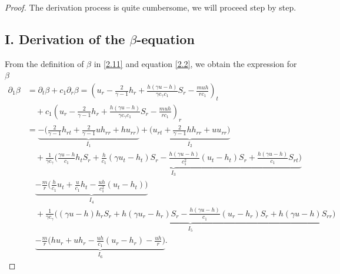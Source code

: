 \documentclass[11pt,reqno]{article}
\numberwithin{equation}{section}
\begin{document}
\begin{proof}
The derivation process is quite cumbersome, we will proceed step by step.

\subsection*{I. Derivation of the $\beta$-equation}
From the definition of $\beta$ in \eqref{2.11} and equation \eqref{2.2}, we obtain the expression for $\beta$
\begin{align}\label{3.4}
\partial_1\beta &= \partial_t\beta + c_1\partial_r \beta  =\left(u_r-\frac{2}{\gamma-1}h_r+\frac{h(\gamma u-h)}{\gamma c_\gamma c_1}S_r-\frac{m uh}{rc_1}\right)_t \nonumber\\
    &\quad +c_1\left(u_r-\frac{2}{\gamma-1}h_r+\frac{h(\gamma u-h)}{\gamma c_\gamma c_1}S_r-\frac{m uh}{rc_1}\right)_r
    \nonumber\\
    &=\underbrace{-\Big(\frac{2}{\gamma-1}h_{rt}+\frac{2}{\gamma-1}uh_{rr}+hu_{rr}\Big)}_{I_1}
    +\underbrace{\Big(u_{rt}+\frac{2}{\gamma-1}hh_{rr}+uu_{rr}\Big)}_{I_2}
    \nonumber\\
    &\quad +\underbrace{\frac{1}{\gamma c_\gamma}\Big(\frac{\gamma u-h}{c_1}h_tS_r+\frac{h}{c_1}(\gamma u_t-h_t)S_r-\frac{h(\gamma u-h)}{c_1^2}(u_t-h_t)S_r+\frac{h(\gamma u-h)}{c_1}S_{rt}\Big)}_{I_3}
    \nonumber\\
    &\quad \underbrace{-\frac{m}{r}\Big(\frac{h}{c_1}u_t+\frac{u}{c_1}h_t-\frac{uh}{c_1^2}(u_t-h_t)\Big)}_{I_4}
    \nonumber\\
    &\quad +\underbrace{\frac{1}{\gamma c_\gamma}\Big((\gamma u-h)h_rS_r+h(\gamma u_r-h_r)S_r-\frac{h(\gamma u-h)}{c_1}(u_r-h_r)S_r+h(\gamma u-h)S_{rr}\Big)}_{I_5}
    \nonumber\\
    &\quad \underbrace{-\frac{m}{r}\Big(hu_r+uh_r-\frac{uh}{c_1}(u_r-h_r)-\frac{uh}{r}\Big)}_{I_6}.
\end{align}


\end{proof}
\end{document}
